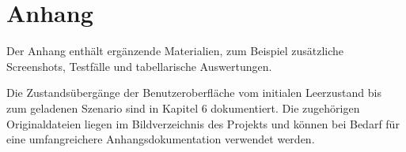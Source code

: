 \chapter{Anhang}

Der Anhang enthält ergänzende Materialien, zum Beispiel zusätzliche Screenshots, Testfälle und tabellarische Auswertungen.

Die Zustandsübergänge der Benutzeroberfläche vom initialen Leerzustand bis zum geladenen Szenario sind in Kapitel 6 dokumentiert. Die zugehörigen Originaldateien liegen im Bildverzeichnis des Projekts und können bei Bedarf für eine umfangreichere Anhangsdokumentation verwendet werden.
